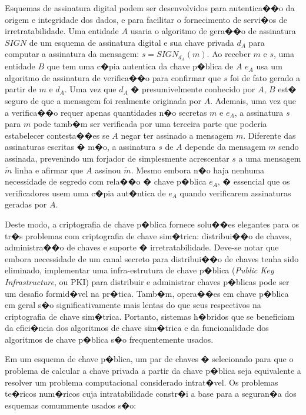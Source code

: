\documentclass[a4paper,capchap,espacoduplo,normaltoc]{abntepusp}
\begin{document}
Esquemas de assinatura digital podem ser desenvolvidos para autentica��o da origem e integridade dos dados, e para facilitar o fornecimento de servi�os de irretratabilidade. Uma entidade $A$ usaria o algoritmo de gera��o de assinatura $SIGN$ de um esquema de assinatura digital e sua chave privada $d_{A}$ para computar a assinatura da mensagem: $s = SIGN_{d_{A}}(m)$. Ao receber $m$ e $s$, uma entidade $B$ que tem uma c�pia autentica da chave p�blica de $A$ $e_{A}$ usa um algoritmo de assinatura de verifica��o para confirmar que $s$ foi de fato gerado a partir de $m$ e $d_{A}$. Uma vez que $d_{A}$ � presumivelmente conhecido por $A$, $B$ est� seguro de que a mensagem foi realmente originada por $A$. Ademais, uma vez que a verifica��o requer apenas quantidades n�o secretas $m$ e $e_{A}$, a assinatura $s$ para $m$ pode tamb�m ser verificada por uma terceira parte que poderia estabelecer contesta��es se $A$ negar ter assinado a mensagem $m$. Diferente das assinaturas escritas � m�o, a assinatura $s$ de $A$ depende da mensagem $m$ sendo assinada, prevenindo um forjador de simplesmente acrescentar $s$ a uma mensagem $\tilde{m}$ linha e afirmar que $A$ assinou $\tilde{m}$. Mesmo embora n�o haja nenhuma necessidade de segredo com rela��o � chave p�blica $e_{A}$, � essencial que os verificadores usem uma c�pia aut�ntica de $e_{A}$ quando verificarem assinaturas geradas por $A$.

Deste modo, a criptografia de chave p�blica fornece solu��es elegantes para os tr�s problemas com criptografia de chave sim�trica: distribui��o de chaves, administra��o de chaves e suporte � irretratabilidade. Deve-se notar que embora necessidade de um canal secreto para distribui��o de chaves tenha sido eliminado, implementar uma infra-estrutura de chave p�blica (\emph{Public Key Infrastructure}, ou PKI) para distribuir e administrar chaves p�blicas pode ser um desafio formid�vel na pr�tica. Tamb�m, opera��es em chave p�blica em geral s�o significativamente mais lentas do que seus respectivos na criptografia de chave sim�trica. Portanto, sistemas h�bridos que se beneficiam da efici�ncia dos algoritmos de chave sim�trica e da funcionalidade dos algoritmos de chave p�blica s�o frequentemente usados.

Em um esquema de chave p�blica, um par de chaves � selecionado para que o problema de calcular a chave privada a partir da chave p�blica seja equivalente a resolver um problema computacional considerado intrat�vel. Os problemas te�ricos num�ricos cuja intratabilidade constr�i a base para a seguran�a dos esquemas comummente usados s�o:
\end{document}
